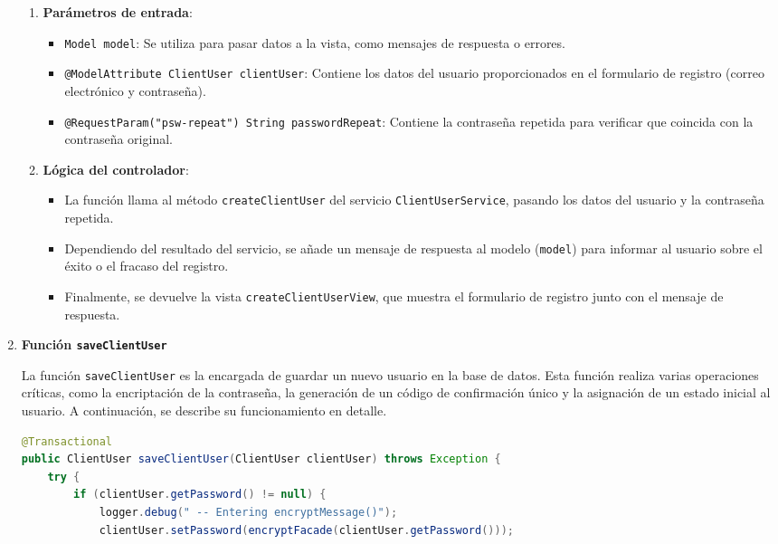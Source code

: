 \documentclass[draft]{scrbook}
\begin{document}
\begin{enumerate}
\begin{enumerate}
    \item \textbf{Parámetros de entrada}:
    \begin{itemize}
        \item \texttt{Model model}: Se utiliza para pasar datos a la vista, como mensajes de respuesta o errores.
        \item \texttt{@ModelAttribute ClientUser clientUser}: Contiene los datos del usuario proporcionados en el formulario de registro (correo electrónico y contraseña).
        \item \texttt{@RequestParam("psw-repeat") String passwordRepeat}: Contiene la contraseña repetida para verificar que coincida con la contraseña original.
    \end{itemize}

    \item \textbf{Lógica del controlador}:
    \begin{itemize}
        \item La función llama al método \texttt{createClientUser} del servicio \texttt{ClientUserService}, pasando los datos del usuario y la contraseña repetida.
        \item Dependiendo del resultado del servicio, se añade un mensaje de respuesta al modelo (\texttt{model}) para informar al usuario sobre el éxito o el fracaso del registro.
        \item Finalmente, se devuelve la vista \texttt{createClientUserView}, que muestra el formulario de registro junto con el mensaje de respuesta.
    \end{itemize}
\end{enumerate}

     \item \textbf{ Función \texttt{saveClientUser}}

La función \texttt{saveClientUser} es la encargada de guardar un nuevo usuario en la base de datos. Esta función realiza varias operaciones críticas, como la encriptación de la contraseña, la generación de un código de confirmación único y la asignación de un estado inicial al usuario. A continuación, se describe su funcionamiento en detalle.

\begin{lstlisting}[language=Java]
@Transactional
public ClientUser saveClientUser(ClientUser clientUser) throws Exception {
    try {
        if (clientUser.getPassword() != null) {
            logger.debug(" -- Entering encryptMessage()");
            clientUser.setPassword(encryptFacade(clientUser.getPassword()));
            

\end{lstlisting}
\end{enumerate}
\end{document}
